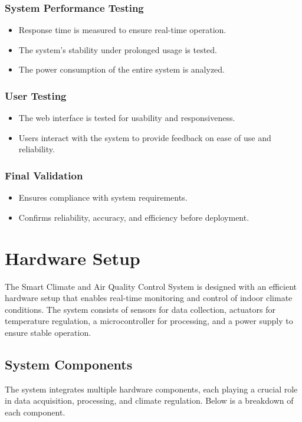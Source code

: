 \documentclass[a4paper]{scrartcl}
\begin{document}
\subsubsection{System Performance Testing}
\begin{itemize}
\item Response time is measured to ensure real-time operation.
\item The system's stability under prolonged usage is tested.
\item The power consumption of the entire system is analyzed.
\end{itemize}

\subsubsection{User Testing}
\begin{itemize}
\item The web interface is tested for usability and responsiveness.
\item Users interact with the system to provide feedback on ease of use and reliability.
\end{itemize}

\subsubsection{Final Validation}
\begin{itemize}
\item Ensures compliance with system requirements.
\item Confirms reliability, accuracy, and efficiency before deployment.
\end{itemize}

\section{Hardware Setup}
The Smart Climate and Air Quality Control System is designed with an efficient hardware setup that enables real-time monitoring and control of indoor climate conditions. The system consists of sensors for data collection, actuators for temperature regulation, a microcontroller for processing, and a power supply to ensure stable operation.

\subsection{System Components}
The system integrates multiple hardware components, each playing a crucial role in data acquisition, processing, and climate regulation. Below is a breakdown of each component.
\end{document}
